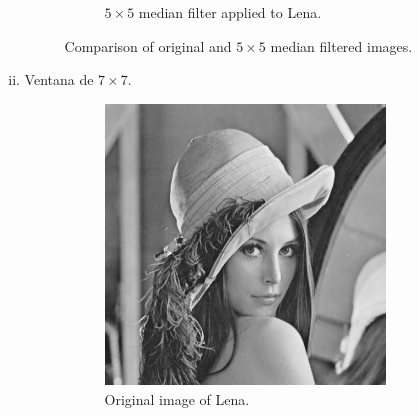 \documentclass{article}
\theoremstyle{problemstyle}
\begin{document}
\begin{problem}
\begin{enumerate}[a)]
\begin{enumerate}[i)]
\begin{figure}[H]
\begin{subfigure}{.45\textwidth}
				            \caption{$5\times 5$ median filter applied to Lena.}
				            \label{fig:lena_median_5x5}
			            \end{subfigure}
			            \caption{Comparison of original and $ 5\times 5 $ median filtered images.}
		            \end{figure}

		      \item Ventana de $ 7\times 7 $.
		            \begin{figure}[H]
			            \begin{subfigure}{.45\textwidth}
				            \centering
				            \includegraphics[width=0.95\textwidth]{lena_ascii.png}
				            \caption{Original image of Lena.}
			            \end{subfigure}
			            \hfill
			            \begin{subfigure}{.45\textwidth}
				            \centering

\end{subfigure}
\end{figure}
\end{enumerate}
\end{enumerate}
\end{problem}
\end{document}
